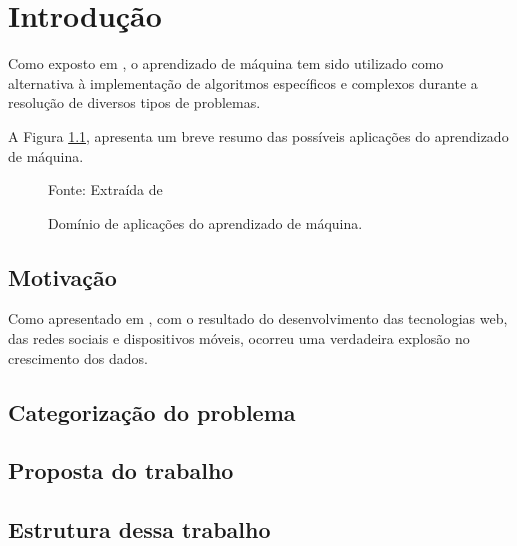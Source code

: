 \chapter{Introdução}

Como exposto em \cite{Torralba2008}, o aprendizado de máquina tem sido utilizado como alternativa à implementação de algoritmos específicos e complexos durante a resolução de diversos tipos de problemas. 

\lipsum[6]

A Figura \ref{fig:mlapplications}, apresenta um breve resumo das possíveis aplicações do aprendizado de máquina.

\begin{figure}[ht]
    \centering
    \caption{Domínio de aplicações do aprendizado de máquina.}
            {Fonte: Extraída de \cite{ApplicationMachineLearning}}
    \label{fig:mlapplications}
\end{figure}

\lipsum[7-8]

\section{Motivação}

Como apresentado em \cite{mohri2018foundations}, com o resultado do desenvolvimento das tecnologias web, das redes sociais e dispositivos móveis, ocorreu uma verdadeira explosão no crescimento dos dados. 

\lipsum[9-16]


\section{Categorização do problema}

\lipsum[17-18]

\section{Proposta do trabalho}

\lipsum[19-21]

\section{Estrutura dessa trabalho}

